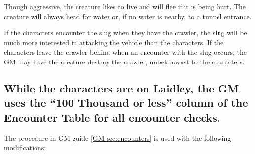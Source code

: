 Though aggressive, the creature likes to live and will flee if it is
being hurt. The creature will always head for water or, if no water is
nearby, to a tunnel entrance.

If the characters encounter the slug when they have the crawler, the
slug will be much more interested in attacking the vehicle than the
characters. If the characters leave the crawler behind when an
encounter with the slug occurs, the GM may have the creature destroy
the crawler, unbeknownst to the characters.


\subsection[Laidley Encounters]{While the characters are on Laidley,
  the GM uses the ``100 Thousand or less'' column of the Encounter  
  Table for all encounter checks.}
\label{sec:laidley-encounters}

The procedure in GM guide \ref{GM-sec:encounters} is used with the
following modifications: 

